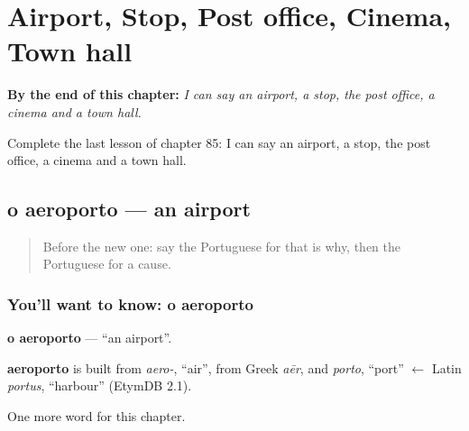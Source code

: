 
\chapter{Airport, Stop, Post office, Cinema, Town hall}
\label{ch:pt-airport-stop-post-office-cinema-town-hall}

\begin{chapteropening}
\textbf{By the end of this chapter:} \emph{I can say an airport, a stop, the post office, a cinema and a town hall.}

Complete the last lesson of chapter 85: I can say an airport, a stop, the post office, a cinema and a town hall.
\end{chapteropening}

\section[o aeroporto]{o aeroporto — an airport}

\label{lesson:PT-C85-aeroporto}



\begin{quote}
Before the new one: say the Portuguese for that is why, then the Portuguese for a cause.
\end{quote}

\subsection*{You'll want to know: o aeroporto}
\textbf{o aeroporto} — \textquotedblleft{}an airport\textquotedblright{}.

\begin{cousinweb}
\textbf{aeroporto} is built from \emph{aero-}, \textquotedblleft{}air\textquotedblright{}, from Greek \emph{aēr}, and \emph{porto}, \textquotedblleft{}port\textquotedblright{} $\leftarrow$ Latin \emph{portus}, \textquotedblleft{}harbour\textquotedblright{} (EtymDB 2.1).
\end{cousinweb}

\begin{grammarlens}[title={What you've built}]
One more word for this chapter.
\end{grammarlens}

